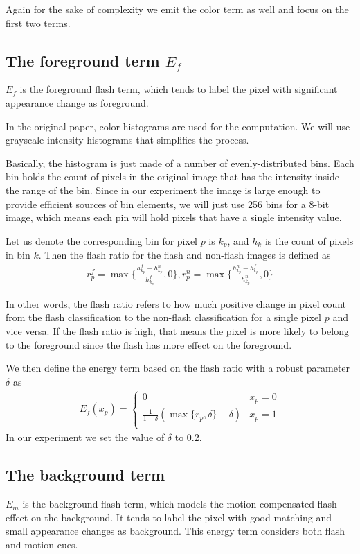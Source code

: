 \documentclass[final]{cvpr}
\begin{document}
Again for the sake of complexity we emit the color term as well and focus on the first two 
terms.

\subsection{The foreground term $E_f$}
$E_f$ is the foreground flash term, which tends to label
the pixel with significant appearance change as foreground.

In the original paper, color histograms are used for the computation. We will use 
grayscale intensity histograms that simplifies the process.

Basically, the histogram is just made of a number of evenly-distributed bins. 
Each bin holds the count of pixels in the original image that has the intensity 
inside the range of the bin. Since in our experiment the image is large enough to 
provide efficient sources of bin elements, we will just use 256 bins for a 8-bit image,
which means each pin will hold pixels that have a single intensity value.

Let us denote the corresponding bin for pixel $p$ is $k_p$, and $h_k$ is the count of 
pixels in bin $k$. Then the flash ratio for the flash and non-flash images is defined as
\begin{align}
   r_p^f = \max\{\frac{h_{k_p}^f - h_{k_p}^n}{h_{k_p}^f}, 0\}, 
   r_p^n = \max\{\frac{h_{k_p}^n - h_{k_p}^f}{h_{k_p}^n}, 0\}
\end{align} 

In other words, the flash ratio refers to how much positive change in pixel count from 
the flash classification to the non-flash classification for a single pixel $p$ and 
vice versa. If the flash ratio is high, that means the pixel is more likely to belong 
to the foreground since the flash has more effect on the foreground. 

We then define the energy term based on the flash ratio with a robust parameter $\delta$ as
\begin{align}
   E_f(x_p) = 
   \left\{\begin{matrix}
      0 & x_p = 0 \\
      \frac{1}{1-\delta}(\max\{r_p,\delta\} - \delta) & x_p = 1 \\
     \end{matrix}
     \right.
\end{align}
In our experiment we set the value of $\delta$ to 0.2.

\subsection{The background term}
$E_m$ is the background flash term, which models the
motion-compensated flash effect on the background. It
tends to label the pixel with good matching and small
appearance changes as background. This energy term
considers both flash and motion cues. 
\end{document}
